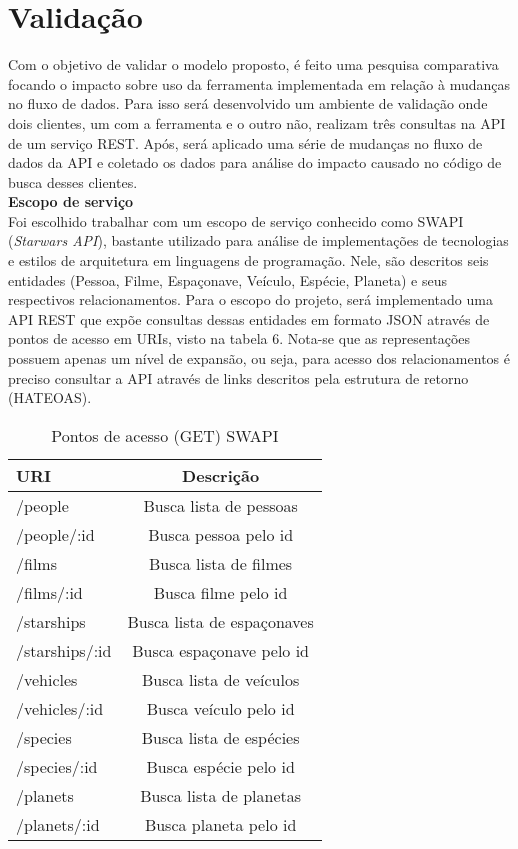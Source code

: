 \section{Validação}

Com o objetivo de validar o modelo proposto, é feito uma pesquisa comparativa focando o impacto sobre uso da ferramenta implementada em relação à mudanças no fluxo de dados. Para isso será desenvolvido um ambiente de validação onde dois clientes, um com a ferramenta e o outro não, realizam três consultas na API de um serviço REST. Após, será aplicado uma série de mudanças no fluxo de dados da API e coletado os dados para análise do impacto causado no código de busca desses clientes. \\

\textbf{Escopo de serviço} \\

Foi escolhido trabalhar com um escopo de serviço conhecido como SWAPI (\textit{Starwars API}), bastante utilizado para análise de implementações de tecnologias e estilos de arquitetura em linguagens de programação. Nele, são descritos seis entidades (Pessoa, Filme, Espaçonave, Veículo, Espécie, Planeta) e seus respectivos relacionamentos. Para o escopo do projeto, será implementado uma API REST que expõe consultas dessas entidades em formato JSON através de pontos de acesso em URIs, visto na tabela 6. Nota-se que as representações possuem apenas um nível de expansão, ou seja, para acesso dos relacionamentos é preciso consultar a API através de links descritos pela estrutura de retorno (HATEOAS).

\begin{table}[H]
  \centering
  \begin{tabular}{|l|c|}
    \hline
    URI & Descrição \\
    \hline
    /people & Busca lista de pessoas \\
    \hline
    /people/:id & Busca pessoa pelo id \\
    \hline
    /films & Busca lista de filmes \\
    \hline
    /films/:id & Busca filme pelo id \\
    \hline
    /starships & Busca lista de espaçonaves \\
    \hline
    /starships/:id & Busca espaçonave pelo id \\
    \hline
    /vehicles & Busca lista de veículos \\
    \hline
    /vehicles/:id & Busca veículo pelo id \\
    \hline
    /species & Busca lista de espécies \\
    \hline
    /species/:id & Busca espécie pelo id \\
    \hline
    /planets & Busca lista de planetas \\
    \hline
    /planets/:id & Busca planeta pelo id \\
    \hline
  \end{tabular}
  \caption{Pontos de acesso (GET) SWAPI}
\end{table}

